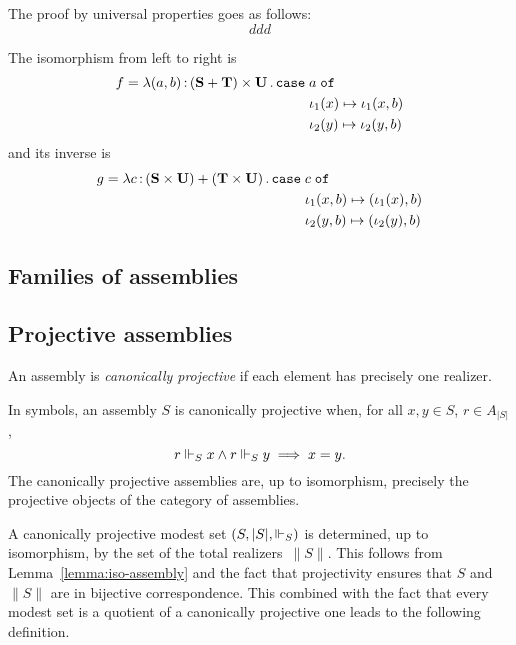 The proof by universal properties goes as follows:
%
\begin{equation*}
  ddd
\end{equation*}

The isomorphism from left to right is
%
\begin{equation*}
  f = \xtlam{(a,b)}{(\asm{S} + \asm{T}) \times \asm{U}}{
    \xcase{a}
    {\iota_1(x)}{\iota_1(x, b)}
    {\iota_2(y)}{\iota_2(y, b)}
  }
\end{equation*}
%
and its inverse is
%
\begin{equation*}
  g = \xtlam{c}{(\asm{S} \times \asm{U}) + (\asm{T} \times \asm{U})}{
    \xcase{c}
    {\iota_1(x,b)}{(\iota_1(x), b)}
    {\iota_2(y,b)}{(\iota_2(y), b)}
  }
\end{equation*}

\subsection{Families of assemblies}
\label{sec:dependent-types}




\subsection{Projective assemblies}
\label{sec:projective-assemblies}


\begin{definition}
  An assembly is \emph{canonically projective} if each element has
  precisely one realizer.
\end{definition}

\noindent
In symbols, an assembly $S$ is canonically projective when, for all
$x, y \in S$, $r \in A_{|S|}$,
%
\begin{equation*}
  r \Vdash_S x \land r \Vdash_S y \implies x = y.
\end{equation*}
%
The canonically projective assemblies are, up to isomorphism,
precisely the projective objects of the category of assemblies.

A canonically projective modest set $(S, |S|, {\Vdash_S})$ is determined,
up to isomorphism, by the set of the total realizers~$\|S\|$. This
follows from Lemma~\ref{lemma:iso-assembly} and the fact that
projectivity ensures that $S$ and $\|S\|$ are in bijective
correspondence. This combined with the fact that every modest set is a
quotient of a canonically projective one leads to the following
definition.


